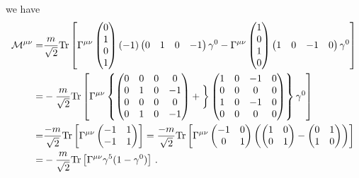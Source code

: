 we have
\begin{align}
\mathcal{M}^{\mu\nu}
=&\dfrac{m}{\sqrt{2}}\text{Tr}\left[
\Gamma^{\mu\nu}\begin{pmatrix}
0\\1\\0\\1
\end{pmatrix}
(-1)\begin{pmatrix}
0&1&0&-1
\end{pmatrix}\gamma^0 -
\Gamma^{\mu\nu}\begin{pmatrix}
1\\0\\1\\0
\end{pmatrix}
\begin{pmatrix}
1&0&-1&0
\end{pmatrix}\gamma^0
\right] \nonumber\\
=&-\dfrac{m}{\sqrt{2}}\text{Tr}\left[
\Gamma^{\mu\nu}\left\{\begin{pmatrix}
0&0&0&0\\0&1&0&-1\\0&0&0&0\\0&1&0&-1
\end{pmatrix}+\bigg{\}}
\begin{pmatrix}
1&0&-1&0\\0&0&0&0\\1&0&-1&0\\0&0&0&0
\end{pmatrix}
\right\}\gamma^0
\right]\nonumber\\
=&\dfrac{-m}{\sqrt{2}}\text{Tr}
\left[\Gamma^{\mu\nu}\begin{pmatrix}
-1&1\\
-1&1
\end{pmatrix}
\right]
=\dfrac{-m}{\sqrt{2}}\text{Tr}
\left[\Gamma^{\mu\nu}\begin{pmatrix}
-1&0\\
0&1
\end{pmatrix}\left(\begin{pmatrix}
1&0\\0&1
\end{pmatrix}-\begin{pmatrix}
0&1\\1&0
\end{pmatrix}\right)
\right]
\nonumber\\
=&-\dfrac{m}{\sqrt{2}}\text{Tr}\left[\Gamma^{\mu\nu}\gamma^5(1-\gamma^0)\right]\,.
\end{align} 
